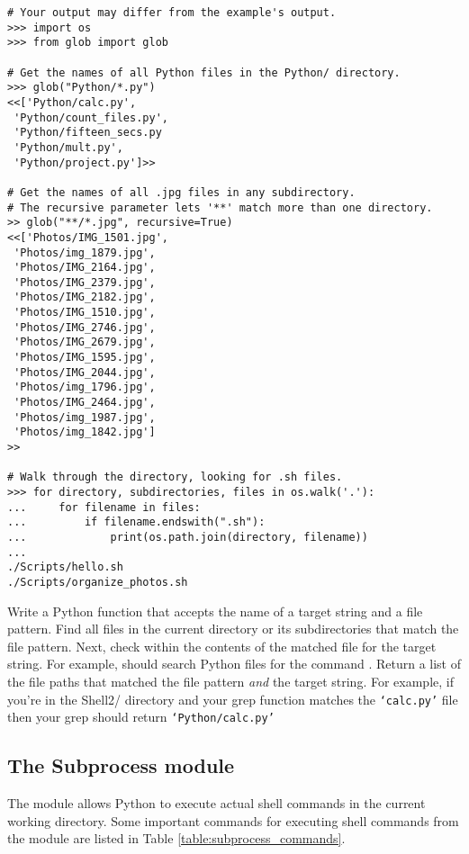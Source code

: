 \begin{lstlisting}
# Your output may differ from the example's output.
>>> import os
>>> from glob import glob

# Get the names of all Python files in the Python/ directory.
>>> glob("Python/*.py")
<<['Python/calc.py',
 'Python/count_files.py',
 'Python/fifteen_secs.py
 'Python/mult.py',
 'Python/project.py']>>

# Get the names of all .jpg files in any subdirectory.
# The recursive parameter lets '**' match more than one directory.
>> glob("**/*.jpg", recursive=True)
<<['Photos/IMG_1501.jpg',
 'Photos/img_1879.jpg',
 'Photos/IMG_2164.jpg',
 'Photos/IMG_2379.jpg',
 'Photos/IMG_2182.jpg',
 'Photos/IMG_1510.jpg',
 'Photos/IMG_2746.jpg',
 'Photos/IMG_2679.jpg',
 'Photos/IMG_1595.jpg',
 'Photos/IMG_2044.jpg',
 'Photos/img_1796.jpg',
 'Photos/IMG_2464.jpg',
 'Photos/img_1987.jpg',
 'Photos/img_1842.jpg']
>>

# Walk through the directory, looking for .sh files.
>>> for directory, subdirectories, files in os.walk('.'):
...     for filename in files:
...         if filename.endswith(".sh"):
...             print(os.path.join(directory, filename))
...
./Scripts/hello.sh
./Scripts/organize_photos.sh
\end{lstlisting}

\begin{problem}
Write a Python function  that accepts the name of a target string and a file pattern.
Find all files in the current directory or its subdirectories that match the file pattern.
Next, check within the contents of the matched file for the target string.
For example,  should search Python files for the command . Return a list of the file paths that matched the file pattern \emph{and} the target string. For example, if you're in the Shell2/ directory and your grep function matches the \texttt{`calc.py'} file then your grep should return \texttt{`Python/calc.py'}



\end{problem}

\subsection*{The Subprocess module} %
The  module allows Python to execute actual shell commands in the current working directory.
Some important commands for executing shell commands from the  module are listed in Table \ref{table:subprocess_commands}.

